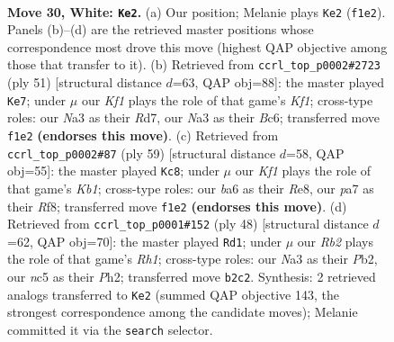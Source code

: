\documentclass[11pt]{article}
\begin{document}
\clearpage

\begin{figure}[p]\centering
\begin{subfigure}{0.46\textwidth}\centering
\resizebox{\linewidth}{!}{%
\newchessgame
\chessboard[
  setfen={1r3rk1/p4p2/bpB1p1pp/2n5/2P5/N1B1P2P/PR3PP1/3R1K2 w - - 5 30},
  showmover=false,
  pgfstyle=straightmove, color=movearrow, markmove={f1-e2}
]}
\caption{}
\end{subfigure}\hfill
\begin{subfigure}{0.46\textwidth}\centering
\resizebox{\linewidth}{!}{%
\newchessgame
\chessboard[
  setfen={1r3k2/3r1p2/2b2np1/p1pp3p/5P1P/P1N1P3/1PRR1PB1/6K1 b - - 1 26},
  showmover=false,
  pgfstyle=straightmove, color=movearrow, markmove={f8-e7}
]}
\caption{}
\end{subfigure}
\\[4pt]
\begin{subfigure}{0.46\textwidth}\centering
\resizebox{\linewidth}{!}{%
\newchessgame
\chessboard[
  setfen={1k2rr2/2p5/p1p4n/1p2Ppb1/7p/7P/PPP3PB/3NRR1K b - - 1 30},
  showmover=false,
  pgfstyle=straightmove, color=movearrow, markmove={b8-c8}
]}
\caption{}
\end{subfigure}\hfill
\begin{subfigure}{0.46\textwidth}\centering
\resizebox{\linewidth}{!}{%
\newchessgame
\chessboard[
  setfen={1r3rk1/2b2ppp/p2p2n1/1p1B4/4P1P1/1RP2N2/PP5P/1K5R w - - 0 25},
  showmover=false,
  pgfstyle=straightmove, color=movearrow, markmove={h1-d1}
]}
\caption{}
\end{subfigure}
\caption{\textbf{Move 30, White: \texttt{Ke2}.} (a) Our position; Melanie plays \texttt{Ke2} (\texttt{f1e2}). Panels (b)--(d) are the retrieved master positions whose correspondence most drove this move (highest QAP objective among those that transfer to it). (b) Retrieved from \texttt{ccrl\_top\_p0002\#2723} (ply 51) [structural distance $d$=63, QAP obj=88]: the master played \texttt{Ke7}; under $\mu$ our \emph{Kf1} plays the role of that game's \emph{Kf1}; cross-type roles: our \emph{N}a3 as their \emph{R}d7, our \emph{N}a3 as their \emph{B}c6; transferred move \texttt{f1e2} \textbf{(endorses this move)}. (c) Retrieved from \texttt{ccrl\_top\_p0002\#87} (ply 59) [structural distance $d$=58, QAP obj=55]: the master played \texttt{Kc8}; under $\mu$ our \emph{Kf1} plays the role of that game's \emph{Kb1}; cross-type roles: our \emph{b}a6 as their \emph{R}e8, our \emph{p}a7 as their \emph{R}f8; transferred move \texttt{f1e2} \textbf{(endorses this move)}. (d) Retrieved from \texttt{ccrl\_top\_p0001\#152} (ply 48) [structural distance $d$=62, QAP obj=70]: the master played \texttt{Rd1}; under $\mu$ our \emph{Rb2} plays the role of that game's \emph{Rh1}; cross-type roles: our \emph{N}a3 as their \emph{P}b2, our \emph{n}c5 as their \emph{P}h2; transferred move \texttt{b2c2}. Synthesis: 2 retrieved analogs transferred to \texttt{Ke2} (summed QAP objective 143, the strongest correspondence among the candidate moves); Melanie committed it via the \texttt{search} selector.}
\label{fig:thought-m58}
\end{figure}
\end{document}
